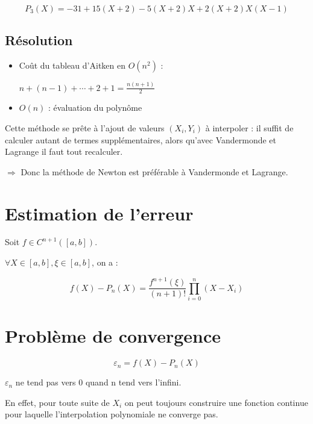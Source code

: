 \begin{equation}
P_3(X) = -31 + 15 (X + 2) - 5 (X + 2) X + 2 (X + 2) X (X - 1)
\end{equation}

\subsection* {Résolution}

\begin{itemize}
\item Coût du tableau d'Aitken en $O(n^2)$ :

$n + (n - 1) + \cdots + 2 + 1 = \frac{n (n + 1)}{2}$
\item $O(n)$ : évaluation du polynôme
\end{itemize}

\bigbreak
Cette méthode se prête à l'ajout de valeurs $(X_i, Y_i)$ à interpoler : il suffit de calculer autant de termes supplémentaires, alors qu'avec Vandermonde et Lagrange il faut tout recalculer.

\bigbreak
$\Rightarrow$ Donc la méthode de Newton est préférable à Vandermonde et Lagrange.



\section {Estimation de l'erreur}

Soit $f \in C^{n + 1}([a,b])$.

$\forall X \in [a,b], \xi \in [a,b]$, on a :

\begin{equation}
f(X) - P_n(X) = \frac{f^{n + 1}(\xi)}{(n + 1)!} \prod_{i = 0}^n (X - X_i)
\end{equation}


\section {Problème de convergence}
\begin{equation}
\varepsilon_n = f(X) - P_n(X)
\end{equation}


$\varepsilon_n$ ne tend pas vers 0 quand n tend vers l'infini.

En effet, pour toute suite de $X_i$ on peut toujours construire une fonction continue pour laquelle l'interpolation polynomiale ne converge pas.


